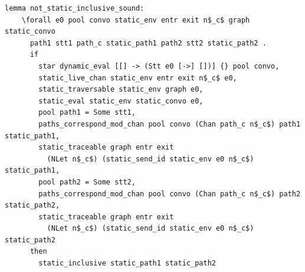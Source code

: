 \documentclass{article}
\begin{document}
\begin{lstlisting}[language=logic, mathescape]
  lemma not_static_inclusive_sound:
    \forall e0 pool convo static_env entr exit n$_c$ graph static_convo
      path1 stt1 path_c static_path1 path2 stt2 static_path2 .
      if
        star dynamic_eval [[] -> (Stt e0 [->] [])] {} pool convo, 
        static_live_chan static_env entr exit n$_c$ e0, 
        static_traversable static_env graph e0, 
        static_eval static_env static_convo e0, 
        pool path1 = Some stt1, 
        paths_correspond_mod_chan pool convo (Chan path_c n$_c$) path1 static_path1, 
        static_traceable graph entr exit
          (NLet n$_c$) (static_send_id static_env e0 n$_c$) static_path1, 
        pool path2 = Some stt2, 
        paths_correspond_mod_chan pool convo (Chan path_c n$_c$) path2 static_path2, 
        static_traceable graph entr exit
          (NLet n$_c$) (static_send_id static_env e0 n$_c$) static_path2
      then
        static_inclusive static_path1 static_path2
  \end{lstlisting}

  
\end{document}
